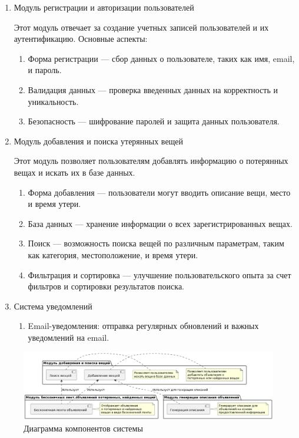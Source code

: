 \begin{enumerate}
	\item Модуль регистрации и авторизации пользователей
	
	Этот модуль отвечает за создание учетных записей пользователей и их аутентификацию. Основные аспекты:
	
	\begin{enumerate}
		\item Форма регистрации --- сбор данных о пользователе, таких как имя, email, и пароль.
		\item Валидация данных --- проверка введенных данных на корректность и уникальность.
		\item Безопасность --- шифрование паролей и защита данных пользователя.
	\end{enumerate}

	\item Модуль добавления и поиска утерянных вещей
	
	Этот модуль позволяет пользователям добавлять информацию о потерянных вещах и искать их в базе данных.
	
	\begin{enumerate}
		\item Форма добавления --- пользователи могут вводить описание вещи, место и время утери.
		\item База данных --- хранение информации о всех зарегистрированных вещах.
		\item Поиск --- возможность поиска вещей по различным параметрам, таким как категория, местоположение, и время утери.
		\item Фильтрация и сортировка --- улучшение пользовательского опыта за счет фильтров и сортировки результатов поиска.
	\end{enumerate}

	\item Система уведомлений
	
	\begin{enumerate}
		\item Email-уведомления: отправка регулярных обновлений и важных уведомлений на email.
	\end{enumerate}
\end{enumerate}

\begin{figure}[htb]
	\centering
	\includegraphics[width=.9\textwidth]{images/full-diagram.png}
	\parskip=6pt
	\caption{Диаграмма компонентов системы}
	\label{fig:system-componets}
\end{figure}

